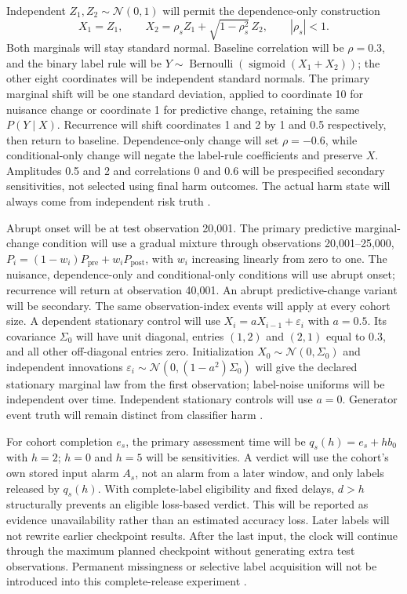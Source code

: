 Independent $Z_1,Z_2\sim\mathcal N(0,1)$ will permit the dependence-only construction
\begin{equation}
X_1=Z_1,\qquad X_2=\rho_sZ_1+\sqrt{1-\rho_s^2}\,Z_2,\qquad |\rho_s|<1.
\end{equation}
Both marginals will stay standard normal. Baseline correlation will be $\rho=0.3$, and the binary label rule will be $Y\sim\operatorname{Bernoulli}(\operatorname{sigmoid}(X_1+X_2))$; the other eight coordinates will be independent standard normals. The primary marginal shift will be one standard deviation, applied to coordinate 10 for nuisance change or coordinate 1 for predictive change, retaining the same $P(Y\mid X)$. Recurrence will shift coordinates 1 and 2 by 1 and 0.5 respectively, then return to baseline. Dependence-only change will set $\rho=-0.6$, while conditional-only change will negate the label-rule coefficients and preserve $X$. Amplitudes 0.5 and 2 and correlations 0 and 0.6 will be prespecified secondary sensitivities, not selected using final harm outcomes. The actual harm state will always come from independent risk truth \cite{driftvis,gretton}.

Abrupt onset will be at test observation 20,001. The primary predictive marginal-change condition will use a gradual mixture through observations 20,001--25,000, $P_i=(1-w_i)P_{\mathrm{pre}}+w_iP_{\mathrm{post}}$, with $w_i$ increasing linearly from zero to one. The nuisance, dependence-only and conditional-only conditions will use abrupt onset; recurrence will return at observation 40,001. An abrupt predictive-change variant will be secondary. The same observation-index events will apply at every cohort size. A dependent stationary control will use $X_i=aX_{i-1}+\varepsilon_i$ with $a=0.5$. Its covariance $\Sigma_0$ will have unit diagonal, entries $(1,2)$ and $(2,1)$ equal to 0.3, and all other off-diagonal entries zero. Initialization $X_0\sim\mathcal N(0,\Sigma_0)$ and independent innovations $\varepsilon_i\sim\mathcal N(0,(1-a^2)\Sigma_0)$ will give the declared stationary marginal law from the first observation; label-noise uniforms will be independent over time. Independent stationary controls will use $a=0$. Generator event truth will remain distinct from classifier harm \cite{souza,cerqueira}.

For cohort completion $e_s$, the primary assessment time will be $q_s(h)=e_s+hb_0$ with $h=2$; $h=0$ and $h=5$ will be sensitivities. A verdict will use the cohort's own stored input alarm $A_s$, not an alarm from a later window, and only labels released by $q_s(h)$. With complete-label eligibility and fixed delays, $d>h$ structurally prevents an eligible loss-based verdict. This will be reported as evidence unavailability rather than an estimated accuracy loss. Later labels will not rewrite earlier checkpoint results. After the last input, the clock will continue through the maximum planned checkpoint without generating extra test observations. Permanent missingness or selective label acquisition will not be introduced into this complete-release experiment \cite{alencar}.


